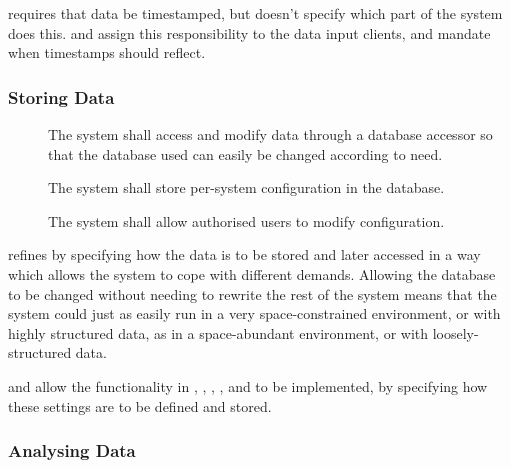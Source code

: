  requires that data be timestamped, but doesn’t specify which
part of the system does this.  and  assign this
responsibility to the data input clients, and mandate when timestamps
should reflect.

\subsubsection{Storing Data}
\label{sec:requirements-functional-storing}

\begin{description}
 \item[] The system shall access and modify data through a
 database accessor so that the database used can easily be changed
 according to need.

 \item[] The system shall store per-system configuration in
 the database.

 \item[] The system shall allow authorised users to modify
 configuration. 
\end{description}

 refines  by specifying how the data is to be stored and
later accessed in a way which allows the system to cope with different
demands. Allowing the database to be changed without needing to
rewrite the rest of the system means that the system could just as
easily run in a very space-constrained environment, or with highly
structured data, as in a space-abundant environment, or with
loosely-structured data.

 and  allow the functionality in , ,
, , and  to be implemented, by specifying how these
settings are to be defined and stored.

\subsubsection{Analysing Data}
\label{sec:requirements-functional-analysing}

